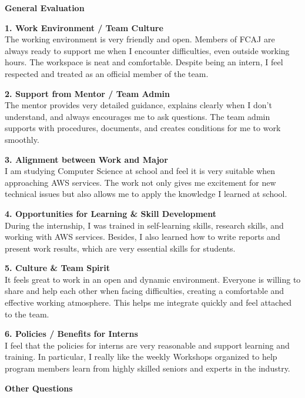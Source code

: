 \vspace{0.5em}\noindent\textbf{General Evaluation}\par

\textbf{1. Work Environment / Team Culture}\\
The working environment is very friendly and open. Members of FCAJ are
always ready to support me when I encounter difficulties, even outside
working hours. The workspace is neat and comfortable. Despite being an
intern, I feel respected and treated as an official member of the team.

\textbf{2. Support from Mentor / Team Admin}\\
The mentor provides very detailed guidance, explains clearly when I
don't understand, and always encourages me to ask questions. The team
admin supports with procedures, documents, and creates conditions for me
to work smoothly.

\textbf{3. Alignment between Work and Major}\\
I am studying Computer Science at school and feel it is very suitable
when approaching AWS services. The work not only gives me excitement for
new technical issues but also allows me to apply the knowledge I learned
at school.

\textbf{4. Opportunities for Learning \& Skill Development}\\
During the internship, I was trained in self-learning skills, research
skills, and working with AWS services. Besides, I also learned how to
write reports and present work results, which are very essential skills
for students.

\textbf{5. Culture \& Team Spirit}\\
It feels great to work in an open and dynamic environment. Everyone is
willing to share and help each other when facing difficulties, creating
a comfortable and effective working atmosphere. This helps me integrate
quickly and feel attached to the team.

\textbf{6. Policies / Benefits for Interns}\\
I feel that the policies for interns are very reasonable and support
learning and training. In particular, I really like the weekly Workshops
organized to help program members learn from highly skilled seniors and
experts in the industry.

\vspace{0.5em}\noindent\textbf{Other Questions}\par

